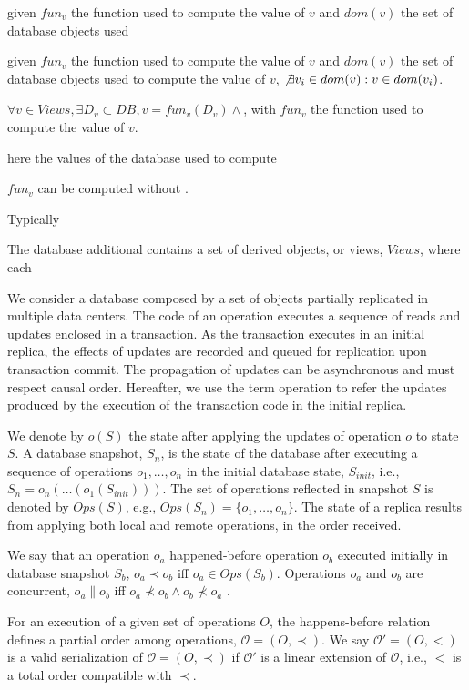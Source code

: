\documentclass{vldb}
\begin{document}
given  $fun_v$ the function used to compute the value of $v$ and $dom(v)$ the set of database objects used



given  $fun_v$ the function used to compute the value of $v$ and $dom(v)$ the set of database objects used
to compute the value of $v$, $\not \exists v_i \in dom(v): v \in dom(v_i)$.

 
$\forall v \in Views, \exists D_v \subset DB, v = fun_v(D_v)  \wedge $, with $fun_v$ the function used to compute 
the value of $v$. 

here the values of the database used to compute 


 $fun_v$ can be computed without .


Typically 

The database additional contains a set of derived objects, or views, $Views$, where each 

 

We consider a database composed by a set of objects partially replicated in
multiple data centers.
The code of an operation executes a sequence of reads
and updates enclosed in a transaction.
As the transaction executes in an initial replica, the effects of updates are 
recorded and queued for replication upon transaction commit.
The propagation of updates can be asynchronous and must respect causal order.
Hereafter, we use the term operation to refer the updates produced by the 
execution of the transaction code in the initial replica.

We denote by $o(S)$ the state after applying the updates of
operation $o$ to state $S$.
A database snapshot, $S_n$, is the state of the database after
executing a sequence of operations $o_1,\ldots,o_n$
in the initial database state, $S_{init}$, i.e., $S_n =
o_n(\ldots(o_1(S_{init})))$.
The set of operations reflected in snapshot $S$ is denoted by $Ops(S)$,
e.g., $Ops(S_n) = \{o_1,\ldots,o_n\}$.
The state of a replica results from applying both local and remote
operations, in the order received.

We say that an operation $o_a$
happened-before operation $o_b$ executed initially in  database snapshot $S_b$,
$o_a \! \prec o_b$ iff \mbox{$o_a \in Ops(S_b)$}.
Operations $o_a$ and $o_b$ are concurrent, $o_a \! \parallel \! o_b$ iff
$o_a \!\not \prec o_b \! \wedge \! o_b \!\not \prec \! o_a$ \cite{happensbefore}.

For an execution of a given set of operations $O$, the happens-before relation defines
a partial order among operations, \mbox{$\mathcal{O} = (O,\prec)$}.
We say $\mathcal{O'} = (O,<)$ is a valid serialization of $\mathcal{O} = (O,\prec)$
if $\mathcal{O'}$ is a linear extension of $\mathcal{O}$, i.e., $<$ is a total order
compatible with $\prec$.
\end{document}
